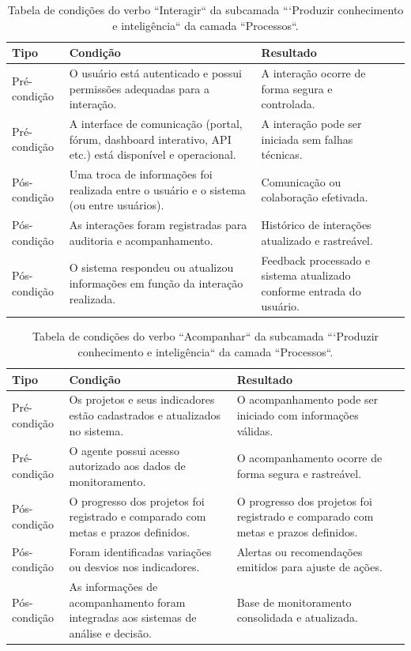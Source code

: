 \begin{apendicesenv}
\begin{table}[H]
\centering
\caption{Tabela de condições do verbo ``Interagir`` da subcamada ```Produzir conhecimento e inteligência`` da camada ``Processos``.}
\begin{tabularx}{\textwidth}{|l|X|X|X|}
\hline
\textbf{Tipo} & \textbf{Condição} & \textbf{Resultado} \\ \hline
Pré-condição & O usuário está autenticado e possui permissões adequadas para a interação. & A interação ocorre de forma segura e controlada.\\ \hline
Pré-condição & A interface de comunicação (portal, fórum, dashboard interativo, API etc.) está disponível e operacional. & A interação pode ser iniciada sem falhas técnicas.\\ \hline
Pós-condição & Uma troca de informações foi realizada entre o usuário e o sistema (ou entre usuários). & Comunicação ou colaboração efetivada.\\ \hline
Pós-condição & As interações foram registradas para auditoria e acompanhamento. & Histórico de interações atualizado e rastreável.\\ \hline
Pós-condição & O sistema respondeu ou atualizou informações em função da interação realizada. & Feedback processado e sistema atualizado conforme entrada do usuário.\\ \hline
\end{tabularx}
\end{table}

\begin{table}[H]
\centering
\caption{Tabela de condições do verbo ``Acompanhar`` da subcamada ```Produzir conhecimento e inteligência`` da camada ``Processos``.}
\begin{tabularx}{\textwidth}{|l|X|X|X|}
\hline
\textbf{Tipo} & \textbf{Condição} & \textbf{Resultado} \\ \hline
Pré-condição & Os projetos e seus indicadores estão cadastrados e atualizados no sistema. & O acompanhamento pode ser iniciado com informações válidas.\\ \hline
Pré-condição & O agente possui acesso autorizado aos dados de monitoramento. & O acompanhamento ocorre de forma segura e rastreável.\\ \hline
Pós-condição & O progresso dos projetos foi registrado e comparado com metas e prazos definidos. & O progresso dos projetos foi registrado e comparado com metas e prazos definidos. \\ \hline
Pós-condição & Foram identificadas variações ou desvios nos indicadores. & Alertas ou recomendações emitidos para ajuste de ações. \\ \hline
Pós-condição & As informações de acompanhamento foram integradas aos sistemas de análise e decisão. & Base de monitoramento consolidada e atualizada.\\ \hline
\end{tabularx}
\end{table}


\end{apendicesenv}
